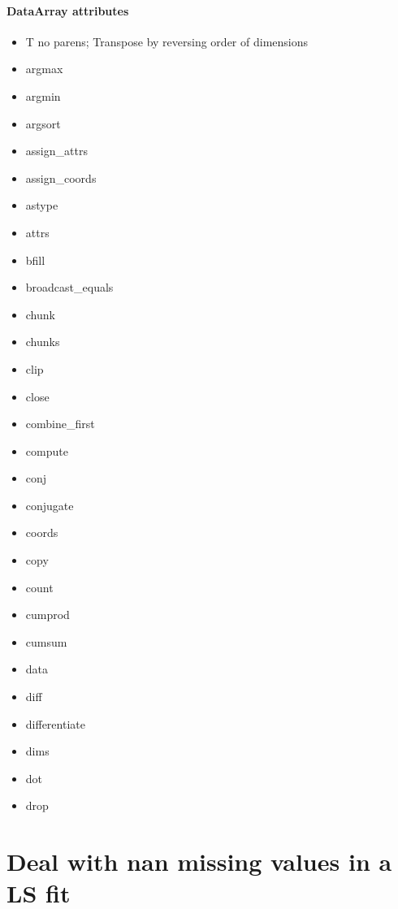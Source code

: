 \documentclass[11pt]{article}
\begin{document}
    \hypertarget{dataarray-attributes}{%
\paragraph{DataArray attributes}\label{dataarray-attributes}}

    \begin{itemize}
\item
  T no parens; Transpose by reversing order of dimensions
\item
  argmax
\item
  argmin
\item
  argsort
\item
  assign\_attrs
\item
  assign\_coords
\item
  astype
\item
  attrs
\item
  bfill
\item
  broadcast\_equals
\item
  chunk
\item
  chunks
\item
  clip
\item
  close
\item
  combine\_first
\item
  compute
\item
  conj
\item
  conjugate
\item
  coords
\item
  copy
\item
  count
\item
  cumprod
\item
  cumsum
\item
  data
\item
  diff
\item
  differentiate
\item
  dims
\item
  dot
\item
  drop
\end{itemize}

    \hypertarget{deal-with-nan-missing-values-in-a-ls-fit}{%
\section{Deal with nan missing values in a LS
fit}\label{deal-with-nan-missing-values-in-a-ls-fit}}
\end{document}

